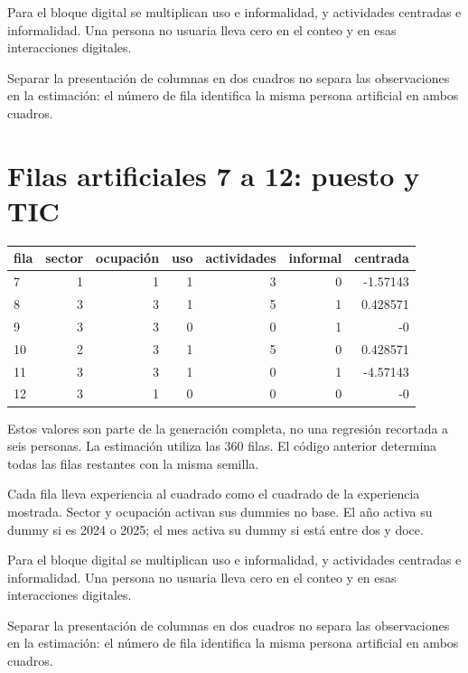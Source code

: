 \documentclass[11pt,a4paper]{article}
\begin{document}
Para el bloque digital se multiplican uso e informalidad, y actividades centradas e informalidad. Una persona no usuaria lleva cero en el conteo y en esas interacciones digitales.

Separar la presentación de columnas en dos cuadros no separa las observaciones en la estimación: el número de fila identifica la misma persona artificial en ambos cuadros.

\clearpage
\section{Filas artificiales 7 a 12: puesto y TIC}

\begin{center}\small
\begin{tabular}{lrrrrrr}
\toprule
fila & sector & ocupación & uso & actividades & informal & centrada\\\midrule
7 & 1 & 1 & 1 & 3 & 0 & -1.57143\\
8 & 3 & 3 & 1 & 5 & 1 & 0.428571\\
9 & 3 & 3 & 0 & 0 & 1 & -0\\
10 & 2 & 3 & 1 & 5 & 0 & 0.428571\\
11 & 3 & 3 & 1 & 0 & 1 & -4.57143\\
12 & 3 & 1 & 0 & 0 & 0 & -0\\
\bottomrule
\end{tabular}\end{center}

Estos valores son parte de la generación completa, no una regresión recortada a seis personas. La estimación utiliza las 360 filas. El código anterior determina todas las filas restantes con la misma semilla.

Cada fila lleva experiencia al cuadrado como el cuadrado de la experiencia mostrada. Sector y ocupación activan sus dummies no base. El año activa su dummy si es 2024 o 2025; el mes activa su dummy si está entre dos y doce.

Para el bloque digital se multiplican uso e informalidad, y actividades centradas e informalidad. Una persona no usuaria lleva cero en el conteo y en esas interacciones digitales.

Separar la presentación de columnas en dos cuadros no separa las observaciones en la estimación: el número de fila identifica la misma persona artificial en ambos cuadros.

\clearpage
\end{document}
